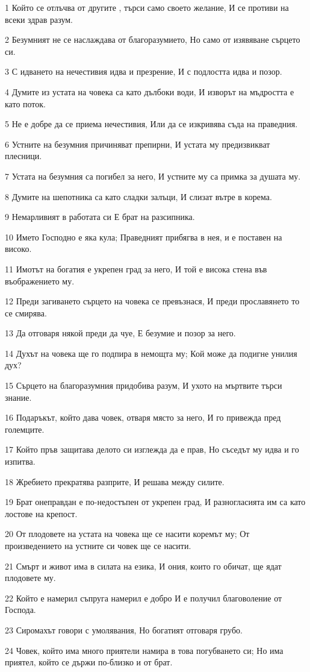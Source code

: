 \par 1 Който се отлъчва от другите , търси само своето желание, И се противи на всеки здрав разум.
\par 2 Безумният не се наслаждава от благоразумието, Но само от изявяване сърцето си.
\par 3 С идването на нечестивия идва и презрение, И с подлостта идва и позор.
\par 4 Думите из устата на човека са като дълбоки води, И изворът на мъдростта е като поток.
\par 5 Не е добре да се приема нечестивия, Или да се изкривява съда на праведния.
\par 6 Устните на безумния причиняват препирни, И устата му предизвикват плесници.
\par 7 Устата на безумния са погибел за него, И устните му са примка за душата му.
\par 8 Думите на шепотника са като сладки залъци, И слизат вътре в корема.
\par 9 Немарливият в работата си Е брат на разсипника.
\par 10 Името Господно е яка кула; Праведният прибягва в нея, и е поставен на високо.
\par 11 Имотът на богатия е укрепен град за него, И той е висока стена във въображението му.
\par 12 Преди загиването сърцето на човека се превъзнася, И преди прославянето то се смирява.
\par 13 Да отговаря някой преди да чуе, Е безумие и позор за него.
\par 14 Духът на човека ще го подпира в немощта му; Кой може да подигне унилия дух?
\par 15 Сърцето на благоразумния придобива разум, И ухото на мъртвите търси знание.
\par 16 Подаръкът, който дава човек, отваря място за него, И го привежда пред големците.
\par 17 Който пръв защитава делото си изглежда да е прав, Но съседът му идва и го изпитва.
\par 18 Жребието прекратява разприте, И решава между силите.
\par 19 Брат онеправдан е по-недостъпен от укрепен град, И разногласията им са като лостове на крепост.
\par 20 От плодовете на устата на човека ще се насити коремът му; От произведението на устните си човек ще се насити.
\par 21 Смърт и живот има в силата на езика, И ония, които го обичат, ще ядат плодовете му.
\par 22 Който е намерил съпруга намерил е добро И е получил благоволение от Господа.
\par 23 Сиромахът говори с умолявания, Но богатият отговаря грубо.
\par 24 Човек, който има много приятели намира в това погубването си; Но има приятел, който се държи по-близко и от брат.

